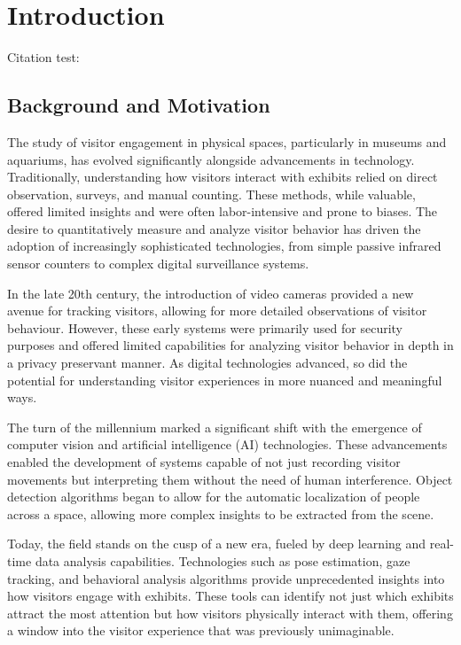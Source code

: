 \section{Introduction}
Citation test: \cite{bj2023selfmade_youtube}

\subsection{Background and Motivation}
The study of visitor engagement in physical spaces, particularly in museums and aquariums, has evolved significantly alongside advancements in technology. Traditionally, understanding how visitors interact with exhibits relied on direct observation, surveys, and manual counting. These methods, while valuable, offered limited insights and were often labor-intensive and prone to biases. The desire to quantitatively measure and analyze visitor behavior has driven the adoption of increasingly sophisticated technologies, from simple passive infrared sensor counters to complex digital surveillance systems.

In the late 20th century, the introduction of video cameras provided a new avenue for tracking visitors, allowing for more detailed observations of visitor behaviour. However, these early systems were primarily used for security purposes and offered limited capabilities for analyzing visitor behavior in depth in a privacy preservant manner. As digital technologies advanced, so did the potential for understanding visitor experiences in more nuanced and meaningful ways.

The turn of the millennium marked a significant shift with the emergence of computer vision and artificial intelligence (AI) technologies. These advancements enabled the development of systems capable of not just recording visitor movements but interpreting them without the need of human interference. Object detection algorithms began to allow for the automatic localization of people across a space, allowing more complex insights to be extracted from the scene.

Today, the field stands on the cusp of a new era, fueled by deep learning and real-time data analysis capabilities. Technologies such as pose estimation, gaze tracking, and behavioral analysis algorithms provide unprecedented insights into how visitors engage with exhibits. These tools can identify not just which exhibits attract the most attention but how visitors physically interact with them, offering a window into the visitor experience that was previously unimaginable.

